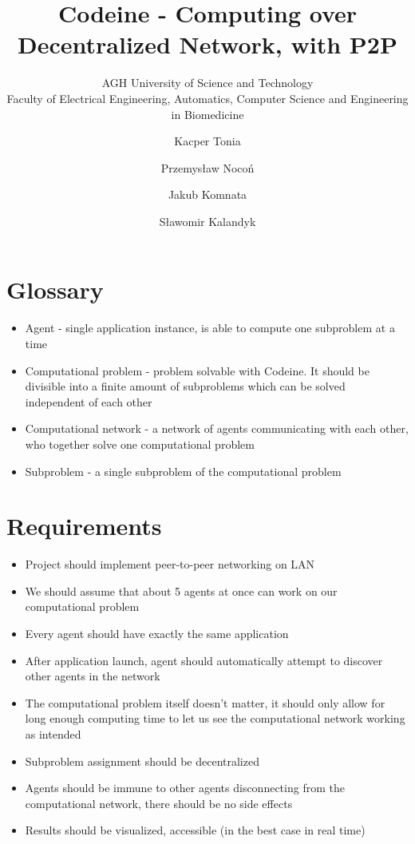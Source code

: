 \documentclass{article}
\title{Codeine - Computing over Decentralized Network, with P2P}
\subtitle{AGH University of Science and Technology\\
    Faculty of Electrical Engineering, Automatics, Computer Science and Engineering in Biomedicine}
\author{Kacper Tonia\and
        Przemysław Nocoń\and
        Jakub Komnata\and
        Sławomir Kalandyk}
\date{}
\begin{document}
\maketitle

\section{Glossary}
\begin{itemize}
    \item Agent - single application instance, is able to compute one subproblem at a time
    \item Computational problem - problem solvable with Codeine. It should be divisible into a finite amount of subproblems which can be solved independent of each other
    \item Computational network - a network of agents communicating with each other, who together solve one computational problem
    \item Subproblem - a single subproblem of the computational problem
\end{itemize}

\section{Requirements}
\begin{itemize}
    \item Project should implement peer-to-peer networking on LAN
    \item We should assume that about 5 agents at once can work on our computational problem
    \item Every agent should have exactly the same application
    \item After application launch, agent should automatically attempt to discover other agents in the network
    \item The computational problem itself doesn't matter, it should only allow for long enough computing time to let us see the computational network working as intended
    \item Subproblem assignment should be decentralized
    \item Agents should be immune to other agents disconnecting from the computational network, there should be no side effects
    \item Results should be visualized, accessible (in the best case in real time)
\end{itemize}
\end{document}

